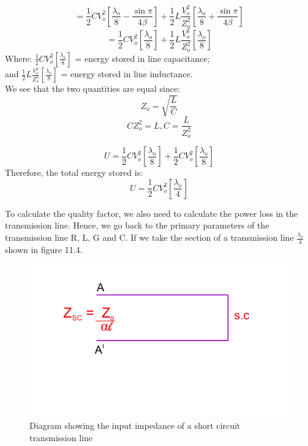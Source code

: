 \begin{equation}
= \frac{1}{2}CV_{o}^{2}\left[\frac{\lambda_{o}}{8} -  \frac{\sin \pi}{4 \beta}\right] + \frac{1}{2}L\frac{V_{o}^{2}}{Z_{o}^{2}}\left[\frac{\lambda_{o}}{8} + \frac{\sin \pi}{4 \beta}\right]
\end{equation}
\begin{equation}
= \frac{1}{2}CV_{o}^{2}\left[\frac{\lambda_{o}}{8}\right] + \frac{1}{2}L\frac{V_{o}^{2}}{Z_{o}^{2}}\left[ \frac{\lambda_{o}}{8} \right]
\end{equation}
Where: $\frac{1}{2}CV_{o}^{2}\left[\frac{\lambda_{o}}{8}\right] $ = energy stored in line capacitance;\\
and  $ \frac{1}{2}L\frac{V_{o}^{2}}{Z_{o}^{2}}\left[ \frac{\lambda_{o}}{8} \right] $ = energy stored in line inductance.\\
We see that the two quantities are equal since:
\begin{equation*}
Z_{o} = \sqrt{\frac{L}{C}}
\end{equation*}
\begin{equation*}
CZ_{o}^{2} = L,
 C= {\frac{L}{Z_{o}^{2}}}
\end{equation*}
  
\begin{equation}
U= \frac{1}{2}CV_{o}^{2}\left[\frac{\lambda_{o}}{8}\right] +\frac{1}{2}CV_{o}^{2}\left[\frac{\lambda_{o}}{8}\right]
\end{equation}
Therefore, the total energy stored is:
\begin{equation}
U= \frac{1}{2}CV_{o}^{2}\left[\frac{\lambda_{o}}{4}\right] 
\end{equation}

To calculate the quality factor, we also need to calculate the power loss in the transmission line. Hence, we go back to the primary parameters of the transmission line R, L, G and C. If we take the section of a transmission line $\frac{\lambda_{o}}{4}$ shown in figure 11.4.
\begin{figure}[h]
\centering
\includegraphics[width=1\linewidth]{./graphics/fig4}
\caption{Diagram showing the input impedance of a short circuit transmission line}
\end{figure}

